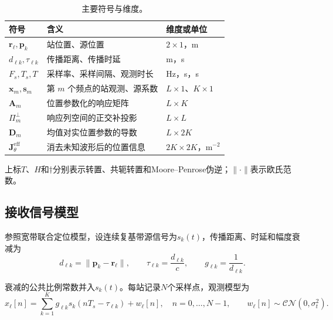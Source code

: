 \documentclass[11pt,a4paper]{article}
\numberwithin{equation}{section}
\numberwithin{figure}{section}
\numberwithin{table}{section}
\begin{document}
\begin{table}[H]
\centering
\caption{主要符号与维度。}\label{tab:2.1}
\small
\setlength{\tabcolsep}{4pt}
\renewcommand{\arraystretch}{1.2}
\begin{tabularx}{\linewidth}{Y{0.85}Y{1.35}Y{0.8}}
\toprule
\textbf{符号} & \textbf{含义} & \textbf{维度或单位} \\
\midrule
$\mathbf{r}_\ell,\mathbf{p}_k$ & 站位置、源位置 & $2\times1$，m \\
$d_{\ell k},\tau_{\ell k}$ & 传播距离、传播时延 & m，s \\
$F_s,T_s,T$ & 采样率、采样间隔、观测时长 & Hz，s，s \\
$\mathbf{x}_m,\mathbf{s}_m$ & 第 $m$ 个频点的站观测、源系数 & $L\times1$、$K\times1$ \\
$\mathbf{A}_m$ & 位置参数化的响应矩阵 & $L\times K$ \\
$\Pi_m^\perp$ & 响应列空间的正交补投影 & $L\times L$ \\
$\mathbf{D}_m$ & 均值对实位置参数的导数 & $L\times2K$ \\
$\mathbf{J}_{\theta}^{\mathrm{eff}}$ & 消去未知波形后的位置信息 & $2K\times2K$，m$^{-2}$ \\
\bottomrule
\end{tabularx}
\end{table}

上标$T$、$H$和$\dagger$分别表示转置、共轭转置和Moore–Penrose伪逆；$\|\cdot\|$表示欧氏范数。

\subsection{接收信号模型}\label{sec:2.2}

参照宽带联合定位模型\cite{ref05}，设连续复基带源信号为$s_k(t)$，传播距离、时延和幅度衰减为
\begin{equation}\label{eq:2.2}
d_{\ell k}=\|\mathbf{p}_k-\mathbf{r}_\ell\|, \qquad \tau_{\ell k}=\frac{d_{\ell k}}{c}, \qquad g_{\ell k}=\frac{1}{d_{\ell k}}.
\end{equation}

衰减的公共比例常数并入$s_k(t)$。每站记录$N$个采样点，观测模型为
\begin{equation}\label{eq:2.3}
x_\ell[n] =\sum_{k=1}^{K}g_{\ell k} s_k(nT_s-\tau_{\ell k})+w_\ell[n], \quad n=0,\ldots,N-1, \qquad w_\ell[n]\sim\mathcal{CN}(0,\sigma_t^2).
\end{equation}
\end{document}
